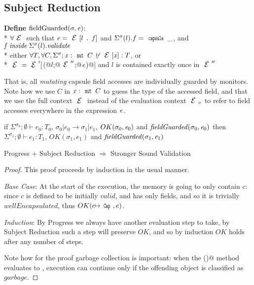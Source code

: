 \subsection{Subject Reduction}

\noindent\textbf{Define} $\text{fieldGuarded}(\sigma,\e)$:\\*
\indent$\forall \ctx$ such that $\e=\ctx[l\singleDot\f] $
and $\Sigma^\sigma(l).f=\Kw{capsule}\,\_$, and $\f\mathrel{\mathit{inside}} \Sigma^\sigma(l).\mathit{validate}$\\*
\indent\indent either
$\forall T, \forall C, \Sigma^\sigma;\x:\Kw{mut}\,C\,\not\vdash\ctx[\x]:T$, or\\*
\indent\indent $\ctx=\ctx'[$\Q@M(@$l$\Q@;@$\ctx''$\Q@;@${\mathit{e}}$\Q@)@$]$ and $l$ is contained exactly once in $\ctx''$

That is, all \emph{mutating} capsule field accesses are individually guarded by monitors.
Note how we use $C$ in $\x:\Kw{mut}\,C$ to guess the type of the accessed field,
and that we use the full context $\ctx$ instead of the evaluation context $\ctx_v$
to refer to field accesses everywhere in the expression ${\mathit{e}}$.


\begin{theorem}
if $\Sigma^{\sigma_0};\emptyset\vdash e_0: T_0$,
$\sigma_0|e_0\rightarrow \sigma_1|e_1$,
$OK(\sigma_0,\e_0)$
and
$\mathit{fieldGuarded}(\sigma_0,\e_0)$
then
$\Sigma^{\sigma_1};\emptyset\vdash e_1: T_1$,
$OK(\sigma_1,e_1)$ and
$\mathit{fieldGuarded}(\sigma_1,\e_1)$
\end{theorem}

\begin{theorem}
	Progress + Subject Reduction $\Rightarrow$ Stronger Sound Validation
\end{theorem}
\begin{proof}
This proof proceeds by induction in the usual manner.

\emph{Base Case}: At the start of the execution, the memory is going to only contain $c$: since $c$ is defined to be initially $\mathit{valid}$, and has only \Q@mut@ fields, and so it is trivially $\mathit{wellEncapsulated}$, thus $OK(c\mapsto\Kw{Cap},e)$.

\emph{Induction}: By Progress we always have another evaluation step to take, by Subject Reduction such a step will preserve $\mathit{OK}$, and so by induction $\mathit{OK}$ holds after any number of steps.

Note how for the proof garbage collection is important:
when the \Q@validate()@ method evaluates to \Q@false@,
execution can continue only if the offending object is classified as $garbage$.
\end{proof}

